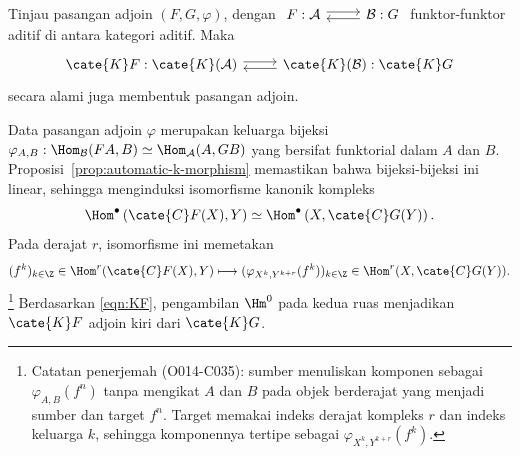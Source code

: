 \begin{proposisi}\label{prop:KF-adjoint}
	Tinjau pasangan adjoin $(F,G,\varphi)$, dengan
	$\begin{tikzcd}
		F: \mathcal{A} \arrow[shift left, r] & \mathcal{B} \arrow[shift left, l] : G
	\end{tikzcd}$
	funktor-funktor aditif di antara kategori aditif. Maka
	\[\begin{tikzcd}
		\cate{K}F: \cate{K}(\mathcal{A}) \arrow[shift left, r] & \cate{K}(\mathcal{B}) \arrow[shift left, l] : \cate{K}G
	\end{tikzcd}\]
	secara alami juga membentuk pasangan adjoin.
\end{proposisi}
\begin{bukti}
	Data pasangan adjoin $\varphi$ merupakan keluarga bijeksi
	$\varphi_{A,B}:\Hom_{\mathcal{B}}(FA,B)\simeq
	\Hom_{\mathcal{A}}(A,GB)$ yang bersifat funktorial dalam $A$ dan $B$.
	Proposisi~\ref{prop:automatic-k-morphism} memastikan bahwa bijeksi-bijeksi
	ini linear, sehingga menginduksi isomorfisme kanonik kompleks
	\[ \Hom^\bullet\left( \cate{C}F(X), Y \right) \simeq \Hom^\bullet\left( X, \cate{C}G(Y) \right). \]
	Pada derajat $r$, isomorfisme ini memetakan
	\[
		(f^k)_{k\in\Z}\in\Hom^r(\cate{C}F(X),Y)
		\longmapsto
		(\varphi_{X^k,Y^{k+r}}(f^k))_{k\in\Z}
		\in\Hom^r(X,\cate{C}G(Y)).
	\]%
	\footnote{Catatan penerjemah (O014-C035): sumber menuliskan komponen
	sebagai $\varphi_{A,B}(f^n)$ tanpa mengikat $A$ dan $B$ pada objek
	berderajat yang menjadi sumber dan target $f^n$. Target memakai indeks
	derajat kompleks $r$ dan indeks keluarga $k$, sehingga komponennya
	tertipe sebagai $\varphi_{X^k,Y^{k+r}}(f^k)$.}
	Berdasarkan \eqref{eqn:KF}, pengambilan $\Hm^0$
	pada kedua ruas menjadikan $\cate{K}F$ adjoin kiri dari $\cate{K}G$.
\end{bukti}
